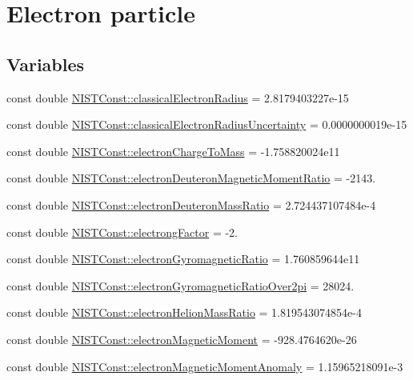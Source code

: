 \hypertarget{group___electron}{}\section{Electron particle}
\label{group___electron}
\subsection*{Variables}
\begin{DoxyCompactItemize}
\item 
const double \hyperlink{group___electron_gac67d6a01d8d75cb66290a36f7123942b}{N\+I\+S\+T\+Const\+::classical\+Electron\+Radius} = 2.\+8179403227e-\/15
\item 
const double \hyperlink{group___electron_ga421451e3f966f187c62c4d44dc16e6e8}{N\+I\+S\+T\+Const\+::classical\+Electron\+Radius\+Uncertainty} = 0.\+0000000019e-\/15
\item 
const double \hyperlink{group___electron_ga941e6299b6ef4b90cc525c335d9989dc}{N\+I\+S\+T\+Const\+::electron\+Charge\+To\+Mass} = -\/1.\+758820024e11
\item 
const double \hyperlink{group___electron_ga3dea53b57010903586a46d81a49fc80f}{N\+I\+S\+T\+Const\+::electron\+Deuteron\+Magnetic\+Moment\+Ratio} = -\/2143.
\item 
const double \hyperlink{group___electron_gad526d455579237804ce6194b50782c0e}{N\+I\+S\+T\+Const\+::electron\+Deuteron\+Mass\+Ratio} = 2.\+724437107484e-\/4
\item 
const double \hyperlink{group___electron_ga65a20f263f8ef8f324ea6d1879050a66}{N\+I\+S\+T\+Const\+::electrong\+Factor} = -\/2.
\item 
const double \hyperlink{group___electron_ga7c738b9078ca0308ee45d3b8bbafadb6}{N\+I\+S\+T\+Const\+::electron\+Gyromagnetic\+Ratio} = 1.\+760859644e11
\item 
const double \hyperlink{group___electron_ga67e6ebbd2c2d8043cbdb09979dc7247b}{N\+I\+S\+T\+Const\+::electron\+Gyromagnetic\+Ratio\+Over2pi} = 28024.
\item 
const double \hyperlink{group___electron_ga5039598cd8a51d15d9dfbb0463c109d6}{N\+I\+S\+T\+Const\+::electron\+Helion\+Mass\+Ratio} = 1.\+819543074854e-\/4
\item 
const double \hyperlink{group___electron_ga81fc83bd665b7b4fb83e9901ed7d6628}{N\+I\+S\+T\+Const\+::electron\+Magnetic\+Moment} = -\/928.\+4764620e-\/26
\item 
const double \hyperlink{group___electron_gaf1a0633191464e7a695240858b9b407c}{N\+I\+S\+T\+Const\+::electron\+Magnetic\+Moment\+Anomaly} = 1.\+15965218091e-\/3

\end{DoxyCompactItemize}
